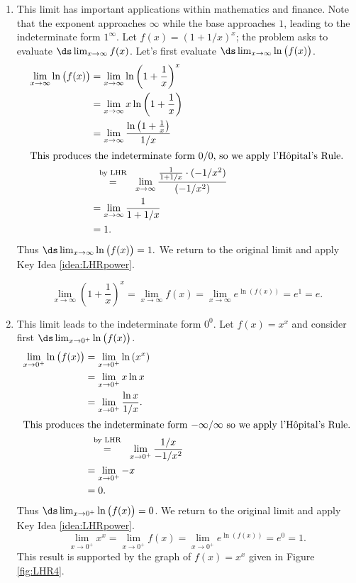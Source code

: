 \begin{solution}
{\begin{enumerate}
\item		%
This limit has important applications within mathematics and finance. Note that the exponent approaches $\infty$ while the base approaches $ 1 $, leading to the indeterminate form $1^\infty$. Let $f(x) = (1+1/x)^x$; the problem asks to evaluate $\ds\lim_{x\to\infty}f(x)$. Let's first evaluate $\ds \lim_{x\to\infty}\ln\big(f(x)\big)$.
\begin{align*}
\lim_{x\to\infty}\ln\big(f(x)\big) & = \lim_{x\to\infty} \ln \left(1+\frac1x\right)^x \\
			&= \lim_{x\to\infty} x\ln\left(1+\frac1x\right)\\
			&=  \lim_{x\to\infty} \frac{\ln\left(1+\frac1x\right)}{1/x}\\
			\intertext{This produces the indeterminate form 0/0, so we apply l'H\^opital's Rule.}
			&\stackrel{\ \text{ by LHR \rule[-5pt]{0pt}{3pt}} \ }{=}	\lim_{x\to\infty} \frac{\frac{1}{1+1/x}\cdot(-1/x^2)}{(-1/x^2)} \\
			&= \lim_{x\to\infty}\frac{1}{1+1/x}\\
			&= 1.
\end{align*}
Thus $\ds\lim_{x\to\infty} \ln \big(f(x)\big) = 1.$ We return to the original limit and apply Key Idea \ref{idea:LHRpower}.

$$\lim_{x\to\infty}\left(1+\frac1x\right)^x = \lim_{x\to\infty} f(x) =  \lim_{x\to\infty}e^{\ln (f(x))} = e^1 = e.$$


\item		This limit leads to the indeterminate form $0^0$. Let $f(x) = x^x$ and consider first $\ds\lim_{x\to0^+} \ln\big(f(x)\big)$. 
\begin{align*}
\lim_{x\to0^+} \ln\big(f(x)\big) &= \lim_{x\to0^+} \ln\left(x^x\right) \\
			&= \lim_{x\to0^+} x\ln x \\
			&= \lim_{x\to0^+} \frac{\ln x}{1/x}.\\
			\intertext{This produces the indeterminate form $-\infty/\infty$ so we apply l'H\^opital's Rule.}
			&\stackrel{\ \text{ by LHR \rule[-5pt]{0pt}{3pt}} \ }{=}	\lim_{x\to0^+} \frac{1/x}{-1/x^2} \\
			&= \lim_{x\to0^+} -x \\
			&= 0.
\end{align*}
Thus $\ds\lim_{x\to0^+} \ln\big(f(x)\big) =0$. We return to the original limit and apply Key Idea \ref{idea:LHRpower}.
$$\lim_{x\to0^+} x^x = \lim_{x\to0^+} f(x) = \lim_{x\to0^+} e^{\ln(f(x))} = e^0 = 1.$$
This result is supported by the graph of $f(x)=x^x$ given in Figure \ref{fig:LHR4}.


\end{enumerate}}
\end{solution}
